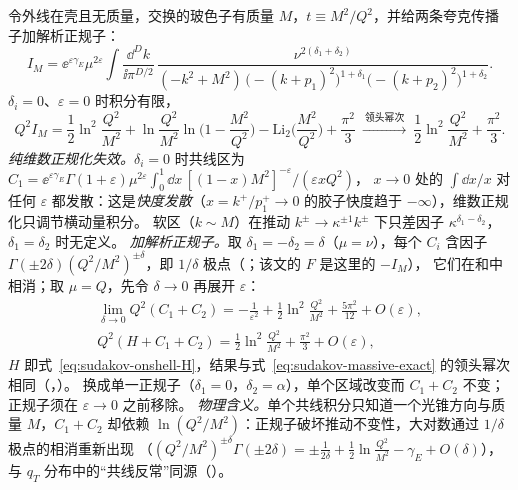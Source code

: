 \begin{example}\label{ex:sudakov-massive}
令外线在壳且无质量，交换的玻色子有质量 $M$，$t\equiv M^2/Q^2$，并给两条夸克传播子加解析正规子：
\[
I_M=\ee^{\varepsilon\gamma_E}\mu^{2\varepsilon}\!\int\!\frac{\dd^Dk}{\ii\pi^{D/2}}\,\frac{\nu^{2(\delta_1+\delta_2)}}{(-k^2+M^2)\,\big(-(k+p_1)^2\big)^{1+\delta_1}\big(-(k+p_2)^2\big)^{1+\delta_2}} .
\]
$\delta_i=0$、$\varepsilon=0$ 时积分有限，\cite[式~(6.30)]{Jantzen2011}
\begin{equation}\label{eq:sudakov-massive-exact}
Q^2I_M=\frac12\ln^2\frac{Q^2}{M^2}+\ln\frac{Q^2}{M^2}\ln\Big(1-\frac{M^2}{Q^2}\Big)-\mathrm{Li}_2\Big(\frac{M^2}{Q^2}\Big)+\frac{\pi^2}3
\ \xrightarrow{\ \text{领头幂次}\ }\ \frac12\ln^2\frac{Q^2}{M^2}+\frac{\pi^2}3 .
\end{equation}
\emph{纯维数正规化失效。}$\delta_i=0$ 时共线区为 $C_1=\ee^{\varepsilon\gamma_E}\Gamma(1+\varepsilon)\mu^{2\varepsilon}\int_0^1\dd x\,[(1-x)M^2]^{-\varepsilon}/(\varepsilon xQ^2)$，
$x\to0$ 处的 $\int\dd x/x$ 对任何 $\varepsilon$ 都发散：这是\emph{快度发散}（$x=k^+/p_1^+\to0$ 的胶子快度趋于 $-\infty$），维数正规化只调节横动量积分。
软区（$k\sim M$）在推动 $k^\pm\to\kappa^{\pm1}k^\pm$ 下只差因子 $\kappa^{\delta_1-\delta_2}$，$\delta_1=\delta_2$ 时无定义。
\emph{加解析正规子。}取 $\delta_1=-\delta_2=\delta$（$\mu=\nu$），每个 $C_i$ 含因子 $\Gamma(\pm2\delta)(Q^2/M^2)^{\pm\delta}$，即 $1/\delta$ 极点（\cite[式~(6.27)]{Jantzen2011}；该文的 $F$ 是这里的 $-I_M$），
它们在和中相消；取 $\mu=Q$，先令 $\delta\to0$ 再展开 $\varepsilon$：
\begin{equation}\label{eq:sudakov-massive-regions}
\begin{gathered}
\lim_{\delta\to0}Q^2(C_1+C_2)=-\frac1{\varepsilon^2}+\frac12\ln^2\frac{Q^2}{M^2}+\frac{5\pi^2}{12}+O(\varepsilon),\\
Q^2(H+C_1+C_2)=\frac12\ln^2\frac{Q^2}{M^2}+\frac{\pi^2}3+O(\varepsilon),
\end{gathered}
\end{equation}
$H$ 即式~\eqref{eq:sudakov-onshell-H}，结果与式~\eqref{eq:sudakov-massive-exact} 的领头幂次相同（\cite[式~(6.29)--(6.30)]{Jantzen2011}，\cite[第~2.3~节，式~(2.50)--(2.52)]{BecherBroggioFerroglia2015}）。
换成单一正规子（$\delta_1=0$，$\delta_2=\alpha$），单个区域改变而 $C_1+C_2$ 不变；正规子须在 $\varepsilon\to0$ 之前移除。
\emph{物理含义。}单个共线积分只知道一个光锥方向与质量 $M$，$C_1+C_2$ 却依赖 $\ln(Q^2/M^2)$：正规子破坏推动不变性，大对数通过 $1/\delta$ 极点的相消重新出现
（$(Q^2/M^2)^{\pm\delta}\Gamma(\pm2\delta)=\pm\frac1{2\delta}+\frac12\ln\frac{Q^2}{M^2}-\gamma_E+O(\delta)$），与 $q_T$ 分布中的“共线反常”\cite{BecherNeubert2011}同源（\cite[第~2.3~节]{BecherBroggioFerroglia2015}）。

\end{example}
